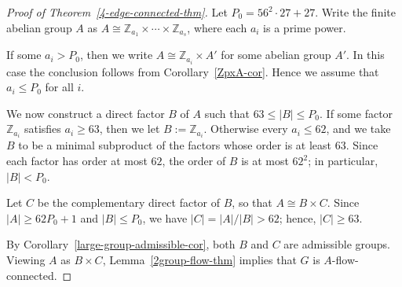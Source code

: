 \documentclass[a4paper,12pt]{article}
\theoremstyle{plain}
\theoremstyle{definition}
\newcommand{\Z}{\mathbb{Z}}
\renewcommand\le\leqslant
\renewcommand\ge\geqslant
\begin{document}
\begin{proof}[Proof of Theorem~\ref{4-edge-connected-thm}]
Let $P_0=56^2\cdot 27+27$. Write the finite abelian group $A$ as
$A\cong \Z_{a_1}\times\cdots\times\Z_{a_s}$, where each $a_i$ is a prime power.

If some $a_i>P_0$, then we write $A\cong \Z_{a_i}\times A'$ for some abelian group $A'$. In this case the conclusion follows from Corollary~\ref{ZpxA-cor}. Hence we assume that $a_i\le P_0$ for all $i$.

We now construct a direct factor $B$ of $A$ such that $63\le |B|\le P_0$. If some factor $\Z_{a_i}$ satisfies $a_i\ge 63$, then we let $B:=\Z_{a_i}$. Otherwise every $a_i\le 62$, and we take $B$ to be a minimal subproduct of the factors whose order is at least $63$. Since each factor has order at most $62$, the order of $B$ is at most $62^2$; in particular, $|B|<P_0$.

Let $C$ be the complementary direct factor of $B$, so that $A\cong B\times C$. Since $|A|\ge 62P_0+1$ and $|B|\le P_0$, we have $|C|=|A|/|B|>62$; hence, $|C|\ge 63$.

By Corollary~\ref{large-group-admissible-cor}, both $B$ and $C$ are admissible groups. Viewing $A$ as $B\times C$, Lemma~\ref{2group-flow-thm} implies that $G$ is $A$-flow-connected.
\end{proof}

{\small
% 
 

}
 
\end{document}
